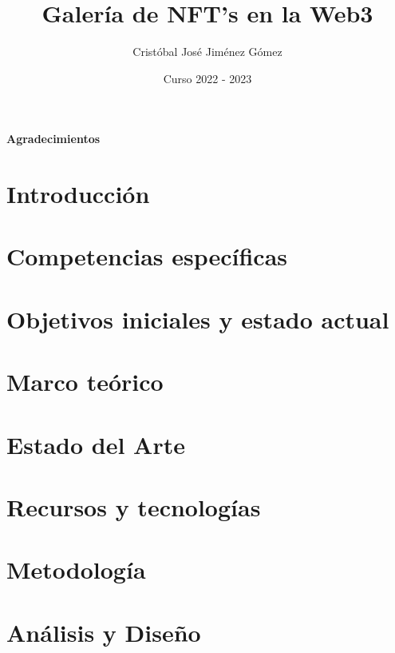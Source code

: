 \documentclass[oneside,12pt]{book}
\title{Galería de NFT's en la Web3}
\author{Cristóbal José Jiménez Gómez}
\date{Curso 2022 - 2023}
\begin{document}


%

\newpage
{}
{\Large{\textbf{Agradecimientos}}}


\clearpage

\tableofcontents
\newpage
\listoffigures
\newpage
\listoftables

\clearpage
{}

\chapter{Introducción}

\newpage
\chapter{Competencias específicas}

\newpage
\chapter{Objetivos iniciales y estado actual}

\newpage
\chapter{Marco teórico}

\newpage

\chapter{Estado del Arte}

\newpage
\chapter{Recursos y tecnologías}

\newpage
\chapter{Metodología}

\newpage
\chapter{Análisis y Diseño}
\newpage
\end{document}
